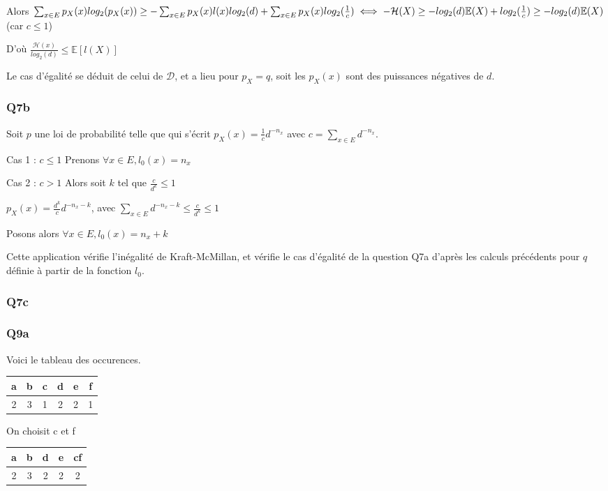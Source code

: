 \documentclass[a4paper,twoside,10pt]{article}
\renewcommand{\H}{\mathcal{H}}
\newcommand{\D}{\mathcal{D}}
\begin{document}
Alors $\sum_{x \in E}p_X(x)log_2(p_X(x)) \geq  -\sum_{x \in E}p_X(x)l(x)log_2(d) + \sum_{x \in E}p_X(x)log_2(\frac{1}{c}) \\
 \iff -\H(X) \geq -log_2(d) \mathbb{E}(X) + log_2(\frac{1}{c}) \\ \geq -log_2(d) \mathbb{E}(X)$ (car $c \leq 1$)

D'où $\frac{\H(x)}{log_2(d)} \leq \mathbb{E}[l(X)]$
 
Le cas d'égalité se déduit de celui de $\D$, et a lieu pour $p_X = q$, soit les $p_X(x)$ sont des puissances négatives de $d$.
 

\subsubsection*{Q7b}
Soit $p$ une loi de probabilité telle que qui s'écrit $p_X(x) = \frac{1}{c}d^{-n_x}$ avec $c = \sum_{x \in E} d^{-n_x}$.

Cas 1 : $c \leq 1$ Prenons $\forall x \in E, l_0(x) = n_x$

Cas 2 : $c > 1$ Alors soit $k$ tel que $\frac{c}{d^k} \leq 1$

$p_X(x) = \frac{d^k}{c}d^{-n_x - k}$, avec $\sum_{x \in E} d^{-n_x - k} \leq \frac{c}{d^k} \leq 1$

Posons alors $\forall x \in E, l_0(x) = n_x + k$

Cette application vérifie l'inégalité de Kraft-McMillan, et vérifie le cas d'égalité de la question Q7a d'après les calculs
précédents pour $q$ définie à partir de la fonction $l_0$.

\subsubsection*{Q7c}

\subsubsection*{Q9a}
Voici le tableau des occurences.

\begin{tabular}{|c|c|c|c|c|c|}
\hline
a & b & c & d & e & f \\
\hline
2 & 3 & 1 & 2 & 2 & 1 \\
\hline
\end{tabular}

On choisit c et f

\begin{tabular}{|c|c|c|c|c|}
\hline
a & b & d & e & cf \\
\hline
2 & 3 & 2 & 2 & 2 \\
\hline
\end{tabular}
\end{document}
